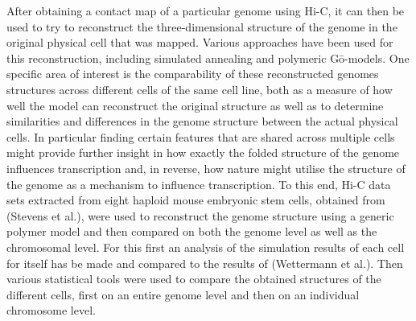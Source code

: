 \documentclass[a4paper,11pt,oneside,final,english,toc=bib]{scrbook}
\begin{document}
After obtaining a contact map of a particular genome using Hi-C, it can then be used to try to reconstruct the three-dimensional structure of the genome in the original physical cell that was mapped. Various approaches have been used for this reconstruction, including simulated annealing\cite{stevens_3d_2017} and polymeric Gō-models\cite{wettermann_minimal_2020}. One specific area of interest is the comparability of these reconstructed genomes structures across different cells of the same cell line, both as a measure of how well the model can reconstruct the original structure as well as to determine similarities and differences in the genome structure between the actual physical cells. In particular finding certain features that are shared across multiple cells might provide further insight in how exactly the folded structure of the genome influences transcription and, in reverse, how nature might utilise the structure of the genome as a mechanism to influence transcription. To this end, Hi-C data sets extracted from eight haploid mouse embryonic stem cells, obtained from (Stevens et al.\cite{stevens_3d_2017}), were used to reconstruct the genome structure using a generic polymer model and then compared on both the genome level as well as the chromosomal level. For this first an analysis of the simulation results of each cell for itself has be made and compared to the results of (Wettermann et al.\cite{wettermann_minimal_2020}). Then various statistical tools were used to compare the obtained structures of the different cells, first on an entire genome level and then on an individual chromosome level.





















\end{document}
